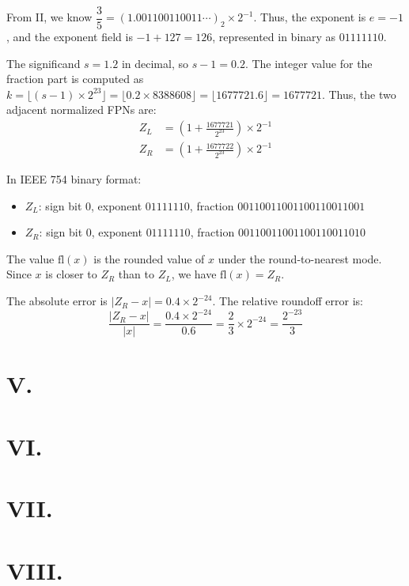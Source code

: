 \documentclass[a4paper]{article}
\begin{document}
From II, we know \(\dfrac35 = (1.001100110011\cdots)_2 \times 2^{-1}\). Thus, the exponent is \(e = -1\), and the exponent field is \(-1 + 127 = 126\), represented in binary as \(01111110\).

The significand \(s = 1.2\) in decimal, so \(s - 1 = 0.2\). The integer value for the fraction part is computed as \(k = \lfloor (s-1) \times 2^{23} \rfloor = \lfloor 0.2 \times 8388608 \rfloor = \lfloor 1677721.6 \rfloor = 1677721\). Thus, the two adjacent normalized FPNs are:
\begin{align*}
Z_L &= \left(1 + \frac{1677721}{2^{23}}\right) \times 2^{-1} \\
Z_R &= \left(1 + \frac{1677722}{2^{23}}\right) \times 2^{-1}
\end{align*}

In IEEE 754 binary format:
\begin{itemize}
\item \(Z_L\): sign bit \(0\), exponent \(01111110\), fraction \(00110011001100110011001\)
\item \(Z_R\): sign bit \(0\), exponent \(01111110\), fraction \(00110011001100110011010\)
\end{itemize}

The value \(\text{fl}(x)\) is the rounded value of \(x\) under the round-to-nearest mode. Since \(x\) is closer to \(Z_R\) than to \(Z_L\), we have \(\text{fl}(x) = Z_R\).

The absolute error is \(|Z_R - x| = 0.4 \times 2^{-24}\). The relative roundoff error is:
\[
\frac{|Z_R - x|}{|x|} = \frac{0.4 \times 2^{-24}}{0.6} = \frac{2}{3} \times 2^{-24} = \frac{2^{-23}}{3}
\]

\section*{V. }


\section*{VI. }

\section*{VII. }


\section*{VIII. }




\end{document}
